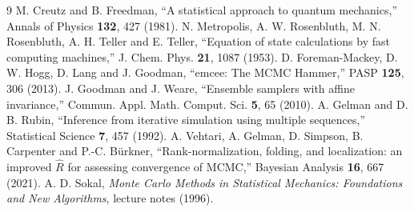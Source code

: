 \documentclass[11pt]{article}
\begin{document}
\begin{thebibliography}{9}
 M. Creutz and B. Freedman, ``A statistical approach to quantum
mechanics,'' Annals of Physics \textbf{132}, 427 (1981).
 N. Metropolis, A. W. Rosenbluth, M. N. Rosenbluth,
A. H. Teller and E. Teller, ``Equation of state calculations by fast computing
machines,'' J. Chem. Phys. \textbf{21}, 1087 (1953).
 D. Foreman-Mackey, D. W. Hogg, D. Lang and J. Goodman,
``emcee: The MCMC Hammer,'' PASP \textbf{125}, 306 (2013).
 J. Goodman and J. Weare, ``Ensemble samplers with affine
invariance,'' Commun. Appl. Math. Comput. Sci. \textbf{5}, 65 (2010).
 A. Gelman and D. B. Rubin, ``Inference from iterative
simulation using multiple sequences,'' Statistical Science \textbf{7}, 457
(1992).
 A. Vehtari, A. Gelman, D. Simpson, B. Carpenter and
P.-C. B\"urkner, ``Rank-normalization, folding, and localization: an improved
$\hat R$ for assessing convergence of MCMC,'' Bayesian Analysis \textbf{16}, 667
(2021).
 A. D. Sokal, \emph{Monte Carlo Methods in Statistical
Mechanics: Foundations and New Algorithms}, lecture notes (1996).
\end{thebibliography}
\end{document}
